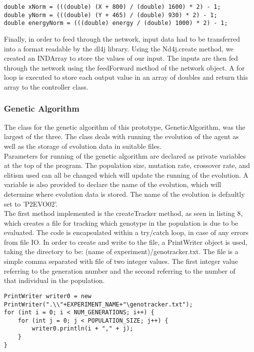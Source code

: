 \documentclass[12pt,a4paper]{article}
\begin{document}
\singlespacing
\begin{lstlisting}[caption=NeuralNetwork class' input normalisation and scaling]
double xNorm = (((double) (X + 800) / (double) 1600) * 2) - 1;
double yNorm = (((double) (Y + 465) / (double) 930) * 2) - 1;
double energyNorm = (((double) energy / (double) 1000) * 2) - 1;
\end{lstlisting}
\onehalfspace
\vspace{8mm}

Finally, in order to feed through the network, input data had to be transferred into a format readable by the dl4j library. Using the Nd4j.create method, we created an INDArray to store the values of our input. The inputs are then fed through the network using the feedForward method of the network object. A for loop is executed to store each output value in an array of doubles and return this array to the controller class.
\newpage
\subsubsection*{Genetic Algorithm}
The class for the genetic algorithm of this prototype, GeneticAlgorithm, was the largest of the three. The class deals with running the evolution of the agent as well as the storage of evolution data in suitable files.\\

Parameters for running of the genetic algorithm are declared as private variables at the top of the program. The population size, mutation rate, crossover rate, and elitism used can all be changed which will update the running of the evolution. A variable is also provided to declare the name of the evolution, which will determine where evolution data is stored. The name of the evolution is defaultly set to 'P2EVO02'.\\

The first method implemented is the createTracker method, as seen in listing 8, which creates a file for tracking which genotype in the population is due to be evaluated. The code is encapsulated within a try/catch loop, in case of any errors from file IO. In order to create and write to the file, a PrintWriter object is used, taking the directory to be: (name of experiment)/genotracker.txt. The file is a simple comma separated with file of two integer values. The first integer value referring to the generation number and the second referring to the number of that individual in the population.

\singlespacing
\begin{lstlisting}[caption=GeneticAlgorithm's code for creating and writing to genotype tracking file]
PrintWriter writer0 = new PrintWriter(".\\"+EXPERIMENT_NAME+"\genotracker.txt");
for (int i = 0; i < NUM_GENERATIONS; i++) {
	for (int j = 0; j < POPULATION_SIZE; j++) {
		writer0.println(i + "," + j);
	}
}
\end{lstlisting}
\onehalfspace
\vspace{3mm}
\end{document}
